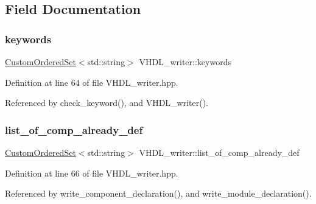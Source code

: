 \subsection{Field Documentation}
\mbox{\label{structVHDL__writer_a68438bcbd4f0b484090a4a9b10d487ee}} 
\subsubsection{\texorpdfstring{keywords}{keywords}}
{\footnotesize\ttfamily \hyperlink{classCustomOrderedSet}{Custom\+Ordered\+Set}$<$std\+::string$>$ V\+H\+D\+L\+\_\+writer\+::keywords\hspace{0.3cm}{\ttfamily [protected]}}



Definition at line 64 of file V\+H\+D\+L\+\_\+writer.\+hpp.



Referenced by check\+\_\+keyword(), and V\+H\+D\+L\+\_\+writer().

\mbox{\label{structVHDL__writer_a54d25538b5aca382ab62f7a5da4743c1}} 
\subsubsection{\texorpdfstring{list\+\_\+of\+\_\+comp\+\_\+already\+\_\+def}{list\_of\_comp\_already\_def}}
{\footnotesize\ttfamily \hyperlink{classCustomOrderedSet}{Custom\+Ordered\+Set}$<$std\+::string$>$ V\+H\+D\+L\+\_\+writer\+::list\+\_\+of\+\_\+comp\+\_\+already\+\_\+def\hspace{0.3cm}{\ttfamily [protected]}}



Definition at line 66 of file V\+H\+D\+L\+\_\+writer.\+hpp.



Referenced by write\+\_\+component\+\_\+declaration(), and write\+\_\+module\+\_\+declaration().

\mbox{\label{structVHDL__writer_a1229d2102ce3fd2c45b9848483e0bd0f}} 
